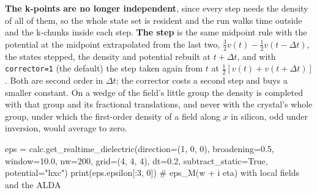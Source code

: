 \documentclass[11pt,a4paper]{article}
\newcommand{\code}[1]{\texttt{\small #1}}
\begin{document}
\textbf{The k-points are no longer independent}, since every step needs the
density of all of them, so the whole state set is resident and the run walks
time outside and the k-chunks inside each step. \textbf{The step} is the same
midpoint rule with the potential at the midpoint extrapolated from the last two,
$\tfrac32 v(t) - \tfrac12 v(t-\Delta t)$, the states stepped, the density and
potential rebuilt at $t+\Delta t$, and with \code{corrector=1} (the default) the
step taken again from $t$ at $\tfrac12[v(t)+v(t+\Delta t)]$. Both are second order
in $\Delta t$; the corrector costs a second step and buys a smaller constant. On a
wedge of the field's little group the density is completed with that group and
its fractional translations, and never with the crystal's whole group, under
which the first-order density of a field along $x$ in silicon, odd under
inversion, would average to zero.

\begin{pycode}
eps = calc.get_realtime_dielectric(direction=(1, 0, 0), broadening=0.5,
                                   window=10.0, nw=200, grid=(4, 4, 4), dt=0.2,
                                   subtract_static=True, potential="hxc")
print(eps.epsilon[:3, 0])        # eps_M(w + i eta) with local fields and the ALDA
\end{pycode}
\end{document}
